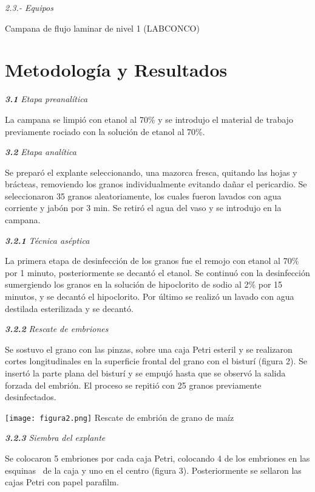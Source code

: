\documentclass{article}
\newenvironment{Figure}
  {\par\medskip\noindent\minipage{\linewidth}}
  {\endminipage\par\medskip}
\begin{document}
\begin{multicols}{2}
\textit{2.3.- Equipos}

Campana de flujo laminar de nivel 1 (LABCONCO)

\section{Metodología y Resultados}

\textit{\textbf{3.1 }}\textit{Etapa preanalítica}

La campana se limpió con etanol al 70\% y se introdujo el material de trabajo previamente rociado con la solución de etanol al 70\%.

\textit{\textbf{3.2 }}\textit{Etapa analítica}

Se preparó el explante seleccionando, una mazorca fresca, quitando las hojas y brácteas, removiendo los granos individualmente evitando dañar el pericardio. Se seleccionaron 35 granos aleatoriamente, los cuales fueron lavados con agua corriente y jabón por 3 min. Se retiró el agua del vaso y se introdujo en la campana.

\textit{\textbf{3.2.1 }}\textit{Técnica aséptica}

La primera etapa de desinfección de los granos fue el remojo con etanol al 70\% por 1 minuto, posteriormente se decantó el etanol. Se continuó con la desinfección sumergiendo los granos en la solución de hipoclorito de sodio al 2\% por 15 minutos, y se decantó el hipoclorito. Por último se realizó un lavado con agua destilada esterilizada y se decantó.

\textit{\textbf{3.2.2 }}\textit{Rescate de embriones }

Se sostuvo el grano con las pinzas, sobre una caja Petri esteril y se realizaron cortes longitudinales en la superficie frontal del grano con el bisturí (figura 2). Se insertó la parte plana del bisturí y se empujó hasta que se observó la salida forzada del embrión. El proceso se repitió con 25 granos previamente desinfectados.

\begin{Figure}
    \centering
    \texttt{[image: figura2.png]}
     {Rescate de embrión de grano de maíz}
\end{Figure}

\textit{\textbf{3.2.3 }}\textit{Siembra del explante }

Se colocaron 5 embriones por cada caja Petri, colocando 4 de los embriones en las esquinas  de la caja y uno en el centro (figura 3). Posteriormente se sellaron las cajas Petri con papel parafilm.


\end{multicols}
\end{document}
